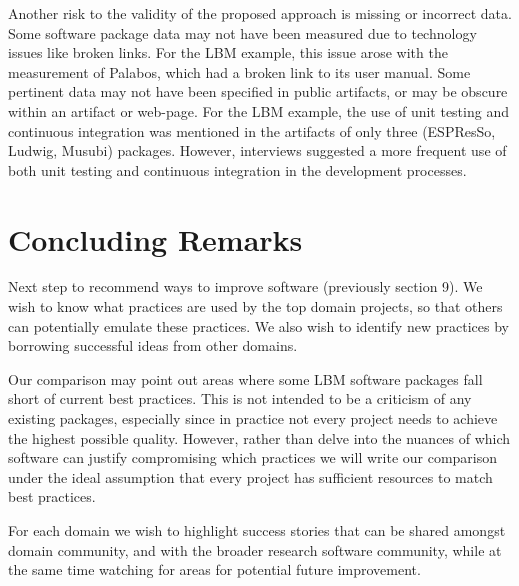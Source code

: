 \documentclass[runningheads]{llncs}
\begin{document}
Another risk to the validity of the proposed approach is missing or incorrect
data. Some software package data may not have been measured due to technology
issues like broken links. For the LBM example, this issue arose with the
measurement of Palabos, which had a broken link to its user manual. Some
pertinent data may not have been specified in public artifacts, or may be
obscure within an artifact or web-page. For the LBM example, the use of unit
testing and continuous integration was mentioned in the artifacts of only three
(ESPResSo, Ludwig, Musubi) packages. However, interviews suggested a more
frequent use of both unit testing and continuous integration in the development
processes.

\section{Concluding Remarks} \label{SecConcludingRemarks}

Next step to recommend ways to improve software (previously section 9).  We wish
to know what practices are used by the top domain projects, so that others can
potentially emulate these practices. We also wish to identify new practices by
borrowing successful ideas from other domains. 

Our comparison may point out areas where some LBM software
packages fall short of current best practices. This is not intended to be a
criticism of any existing packages, especially since in practice not every
project needs to achieve the highest possible quality.  However, rather than
delve into the nuances of which software can justify compromising which
practices we will write our comparison under the ideal assumption that every
project has sufficient resources to match best practices.

For each domain we wish to highlight success stories that can be shared amongst
domain community, and with the broader research software community, while at the
same time watching for areas for potential future improvement.
\end{document}
